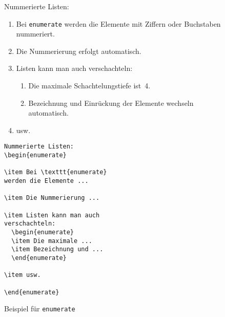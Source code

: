 \begin{figure}[!htbp]
\oben{\textwidth}
\exa
Nummerierte Listen:
\begin{enumerate}
\relax %
\item Bei \texttt{enumerate} werden
die Elemente mit Ziffern oder Buchstaben nummeriert.
\item Die Nummerierung erfolgt
automatisch.
\item Listen kann man auch
verschachteln:
  \begin{enumerate}
  \item Die maximale Schachtelungstiefe
  ist~4.
  \item Bezeichnung und Einrückung der Elemente
  wechseln automatisch.
  \end{enumerate}
\item usw.
\end{enumerate}
\exb
\begin{verbatim}
Nummerierte Listen:
\begin{enumerate}
 
\item Bei \texttt{enumerate}
werden die Elemente ...
 
\item Die Nummerierung ...
 
\item Listen kann man auch
verschachteln:
  \begin{enumerate}
  \item Die maximale ...
  \item Bezeichnung und ...
  \end{enumerate}
 
\item usw.
 
\end{enumerate}
\end{verbatim}
\exc
\unten
\caption{Beispiel für \texttt{enumerate}} \label{enum}
\end{figure}
 
